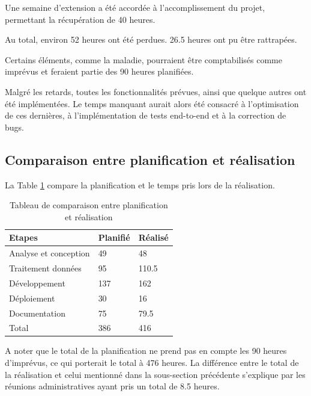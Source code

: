 \documentclass[
    iai, %
    il, %
]{heig-tb}
\begin{document}
Une semaine d'extension a été accordée à l'accomplissement du projet, permettant la récupération de 40 heures.

Au total, environ 52 heures ont été perdues. 26.5 heures ont pu être rattrapées.

Certains éléments, comme la maladie, pourraient être comptabilisés comme imprévus et feraient partie des 90 heures planifiées.

Malgré les retards, toutes les fonctionnalités prévues, ainsi que quelque autres ont été implémentées.
Le temps manquant aurait alors été consacré à l'optimisation de ces dernières, à l'implémentation de tests end-to-end et à la correction de bugs.

\subsection{Comparaison entre planification et réalisation}

La Table \ref{temps} compare la planification et le temps pris lors de la réalisation.

\begin{table}[h]
    \begin{center}
        \begin{tabular}{l|l|l}
            Etapes                & Planifié & Réalisé \\ \hline
            Analyse et conception & 49       & 48      \\
            Traitement données    & 95       & 110.5   \\
            Développement         & 137      & 162     \\
            Déploiement           & 30       & 16      \\
            Documentation         & 75       & 79.5    \\ \hline
            Total                 & 386      & 416
        \end{tabular}
        \caption{Tableau de comparaison entre planification et réalisation \label{temps}}
    \end{center}
\end{table}

A noter que le total de la planification ne prend pas en compte les 90 heures d'imprévus, ce qui porterait le total à 476 heures.
La différence entre le total de la réalisation et celui mentionné dans la sous-section précédente s'explique par les réunions administratives ayant pris un total de 8.5 heures.
\end{document}
